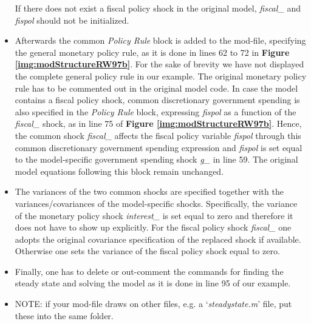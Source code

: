 \begin{itemize}
If there does not exist a fiscal policy shock in the original model, \textit{fiscal\_} and \textit{fispol} should not be initialized.
\item Afterwards the common \textit{Policy Rule} block is added to the mod-file, specifying the general monetary policy rule, as it is done in lines 62 to 72 in {\bf Figure \ref{img:modStructureRW97b}}. For the sake of brevity we have not displayed the complete general policy rule in our example. The original monetary policy rule has to be commented out in the original model code. In case the model contains a fiscal policy shock, common discretionary government spending is also specified in the \textit{Policy Rule} block, expressing \textit{fispol} as a function of the \textit{fiscal\_} shock, as in line 75 of {\bf Figure \ref{img:modStructureRW97b}}. Hence, the common shock \textit{fiscal\_} affects the fiscal policy
variable \textit{fispol} through this common discretionary government spending expression and \textit{fispol} is set equal to the model-specific
government spending shock \textit{g\_} in line 59. The original model equations following this block remain unchanged.
\item The variances of the two common shocks are specified together with the variances/covariances of the model-specific shocks. Specifically, the variance of the monetary policy shock \textit{interest\_} is set equal to zero and therefore it does not have to show up explicitly. For the fiscal policy shock \textit{fiscal\_} one adopts the original covariance specification of the replaced shock if available. Otherwise one sets the variance of the fiscal policy shock equal to zero.
\item Finally, one has to delete or out-comment the commands for finding the steady state and solving the model as it is done in line 95 of our example.
\item NOTE: if your mod-file draws on other files, e.g. a `\textit{steadystate.m}' file, put these into the same folder.

%
\end{itemize}


